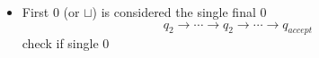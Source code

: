 \begin{frame}[allowframebreaks]
\begin{itemize}
\item First 0 (or $\sqcup$) is considered the single
final 0 
\begin{equation*}
q_2 \rightarrow \cdots
\rightarrow q_2 \rightarrow \cdots \rightarrow
q_{accept}
\end{equation*}
check if single 0



\end{itemize}\end{frame}



